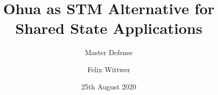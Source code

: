 \documentclass[aspectratio=169, usenames, dvipsnames]{beamer}
\title{Ohua as STM Alternative for Shared State Applications}
\subtitle{Master Defense}
\date{25th August 2020}
\author{Felix Wittwer}
\begin{document}
\begin{frame}
\titlepage
\end{frame}



\end{document}
